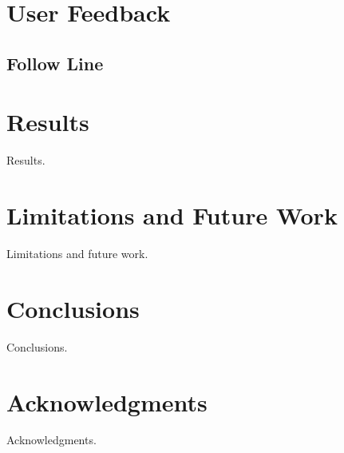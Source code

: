 \documentclass[conference]{acmsiggraph}
\begin{document}
\section{User Feedback}

\subsection{Follow Line}



\section{Results}

Results.


\section{Limitations and Future Work}

Limitations and future work.


\section{Conclusions}

Conclusions.

\section{Acknowledgments}

Acknowledgments.



\end{document}
